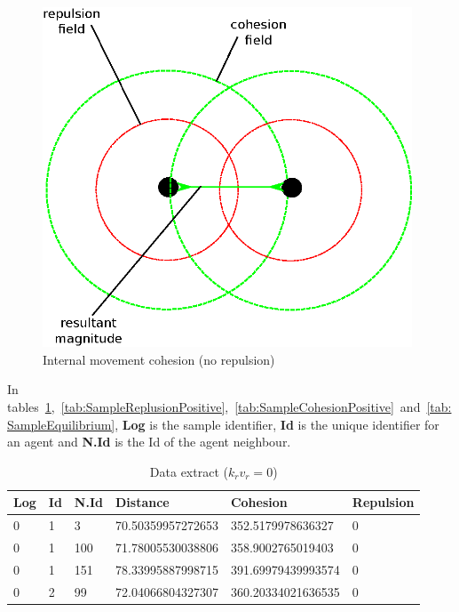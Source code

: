 \begin{figure}[H]
\begin{center}
\includegraphics[width=11cm]{CHAPTER-4/figures/Stability1}
\end{center}
\caption{Internal movement cohesion (no repulsion)} \label{methods:Stability1}
\end{figure}

In tables~\ref{tab:SampleReplusion0},~\ref{tab:SampleReplusionPositive},~\ref{tab:SampleCohesionPositive}~and~\ref{tab:SampleEquilibrium}, \textbf{Log} is the sample identifier, \textbf{Id} is the unique identifier for an agent and \textbf{N.Id} is the Id of the agent neighbour. 

\begin{table}[H]
\begin{center}
\begin{tabular}{| l | l | l | l | l | l |}
\hline
Log &	Id &	N.Id &	Distance &	{\color{green}Cohesion} &	{\color{red}Repulsion} 	\\ \hline
0 &	1 &	3 	 & 70.50359957272653 &	{\color{green}352.5179978636327}  &	{\color{red}0} \\ \hline
0 &	1 &	100 & 71.78005530038806 &	{\color{green}358.9002765019403}  &	{\color{red}0} \\ \hline
0 &	1 &	151 & 78.33995887998715 &	{\color{green}391.69979439993574} &	{\color{red}0} \\ \hline
0 &	2 &	99  &	72.04066804327307 &	{\color{green}360.20334021636535} &	{\color{red}0} \\ 
\hline
\end{tabular}\caption{Data extract ($k_rv_r = 0$)} \label{tab:SampleReplusion0}
\end{center}
\end{table}

